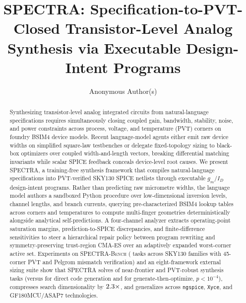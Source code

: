 \documentclass[sigconf,review,anonymous]{acmart}
\begin{document}
\title[SPECTRA: Specification-to-PVT-Closed Analog Synthesis]{SPECTRA: Specification-to-PVT-Closed Transistor-Level Analog Synthesis via Executable Design-Intent Programs}

\author{Anonymous Author(s)}

\begin{abstract}
Synthesizing transistor-level analog integrated circuits from natural-language specifications requires simultaneously closing coupled gain, bandwidth, stability, noise, and power constraints across process, voltage, and temperature (PVT) corners on foundry BSIM4 device models.
Recent language-model agents either emit raw device widths on simplified square-law testbenches or delegate fixed-topology sizing to black-box optimizers over coupled width-and-length vectors, breaking differential matching invariants while scalar SPICE feedback conceals device-level root causes.
We present \textsc{SPECTRA}, a training-free synthesis framework that compiles natural-language specifications into PVT-verified SKY130 SPICE netlists through executable $g_m/I_D$ design-intent programs.
Rather than predicting raw micrometre widths, the language model authors a sandboxed Python procedure over low-dimensional inversion levels, channel lengths, and branch currents, querying pre-characterized BSIM4 lookup tables across corners and temperatures to compute multi-finger geometries deterministically alongside analytical self-predictions.
A four-channel analyzer extracts operating-point saturation margins, prediction-to-SPICE discrepancies, and finite-difference sensitivities to steer a hierarchical repair policy between program rewriting and symmetry-preserving trust-region CMA-ES over an adaptively expanded worst-corner active set.
Experiments on \textsc{SPECTRA-Bench} (\NTasksTotal{} tasks across \NPrimaryFamilies{} SKY130 families with 45-corner PVT and Pelgrom mismatch verification) and an eight-framework external sizing suite show that \textsc{SPECTRA} solves \SpectraPrim{} of near-frontier and PVT-robust synthesis tasks (versus \DirectPrim{} for direct code generation and \GenboPrim{} for generate-then-optimize, $p < 10^{-4}$), compresses search dimensionality by $2.3{}\times$, and generalizes across \texttt{ngspice}, \texttt{Xyce}, and GF180MCU/ASAP7 technologies.
\end{abstract}

\end{document}

